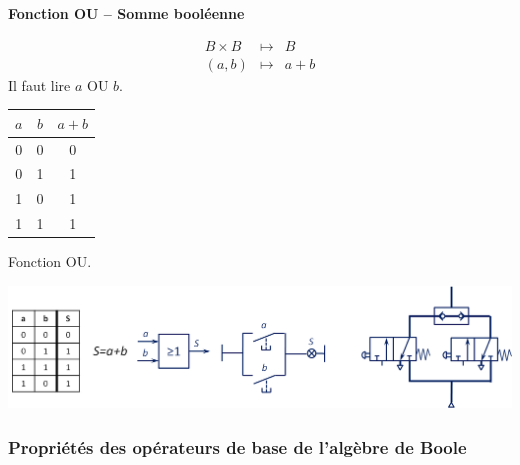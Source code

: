 \begin{defi}
\textbf{Fonction OU -- Somme booléenne}

\begin{minipage}[c]{.45\linewidth}
\begin{eqnarray*}
B \times B &\longmapsto& B\\
(a,b) &\longmapsto& a + b
\end{eqnarray*}
Il faut lire $a$ OU $b$. 
\end{minipage} \hfill
\begin{minipage}[c]{.45\linewidth}
\begin{center}
\begin{tabular}{|c|c||c|}
\hline
$a$ & $b$ & $a+ b$ \\
\hline
0 & 0 & 0 \\ \hline
0 & 1 & 1 \\ \hline
1 & 0 & 1 \\ \hline
1 & 1 & 1 \\ \hline
\end{tabular}
\end{center}
\end{minipage}
\end{defi}

\begin{exemple}
Fonction OU.


\begin{center}
\includegraphics[width=.9\textwidth]{images/OU}
\end{center}
\end{exemple}

\subsubsection{Propriétés des opérateurs de base de l'algèbre de Boole}

